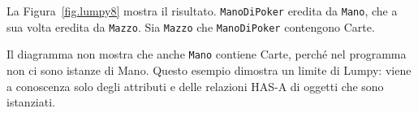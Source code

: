 \documentclass[10pt]{book}
\begin{document}
La Figura~\ref{fig.lumpy8} mostra il risultato.  
{\tt ManoDiPoker} eredita da {\tt Mano}, che a sua volta eredita da {\tt Mazzo}.
Sia {\tt Mazzo} che {\tt ManoDiPoker} contengono Carte.

Il diagramma non mostra che anche  {\tt Mano} contiene Carte, perché nel programma non ci sono istanze di Mano. Questo esempio dimostra un limite di Lumpy: viene a conoscenza solo degli attributi e delle relazioni HAS-A di oggetti che sono istanziati.

\printindex

\clearemptydoublepage
\end{document}
